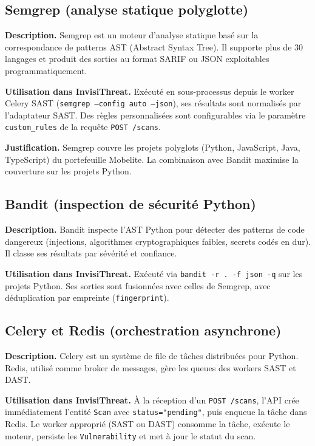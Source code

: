 \subsection{Semgrep (analyse statique polyglotte)}

\textbf{Description.} Semgrep est un moteur d'analyse statique basé sur la correspondance de patterns AST (Abstract Syntax Tree). Il supporte plus de 30 langages et produit des sorties au format SARIF ou JSON exploitables programmatiquement.

\textbf{Utilisation dans InvisiThreat.} Exécuté en sous-processus depuis le worker Celery SAST (\texttt{semgrep --config auto --json}), ses résultats sont normalisés par l'adaptateur SAST. Des règles personnalisées sont configurables via le paramètre \texttt{custom\_rules} de la requête \texttt{POST /scans}.

\textbf{Justification.} Semgrep couvre les projets polyglots (Python, JavaScript, Java, TypeScript) du portefeuille Mobelite. La combinaison avec Bandit maximise la couverture sur les projets Python.

\subsection{Bandit (inspection de sécurité Python)}

\textbf{Description.} Bandit inspecte l'AST Python pour détecter des patterns de code dangereux (injections, algorithmes cryptographiques faibles, secrets codés en dur). Il classe ses résultats par sévérité et confiance.

\textbf{Utilisation dans InvisiThreat.} Exécuté via \texttt{bandit -r . -f json -q} sur les projets Python. Ses sorties sont fusionnées avec celles de Semgrep, avec déduplication par empreinte (\texttt{fingerprint}).

\subsection{Celery et Redis (orchestration asynchrone)}

\textbf{Description.} Celery est un système de file de tâches distribuées pour Python. Redis, utilisé comme broker de messages, gère les queues des workers SAST et DAST.

\textbf{Utilisation dans InvisiThreat.} À la réception d'un \texttt{POST /scans}, l'API crée immédiatement l'entité \texttt{Scan} avec \texttt{status="pending"}, puis enqueue la tâche dans Redis. Le worker approprié (SAST ou DAST) consomme la tâche, exécute le moteur, persiste les \texttt{Vulnerability} et met à jour le statut du scan.

